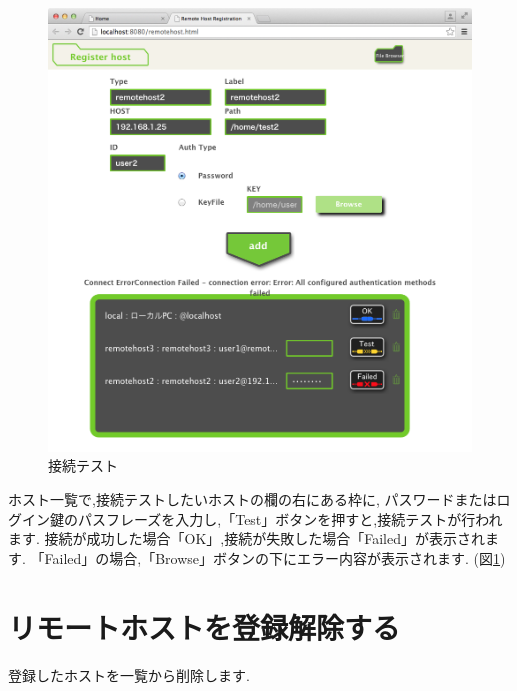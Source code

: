 \documentclass[a4paper,10pt,oneside]{jsbook}
\begin{document}
\begin{figure}[H]
	\begin{center}
		\includegraphics[width=12.0cm]{image/remotehost_001.png}
	\end{center}
	\caption{接続テスト}
	\label{fig:remotetest}
\end{figure}

ホスト一覧で,接続テストしたいホストの欄の右にある枠に,
パスワードまたはログイン鍵のパスフレーズを入力し,「Test」ボタンを押すと,接続テストが行われます.
接続が成功した場合「OK」,接続が失敗した場合「Failed」が表示されます.
「Failed」の場合,「Browse」ボタンの下にエラー内容が表示されます.
(図\ref{fig:remotetest})

\newpage
		
\section{リモートホストを登録解除する}
登録したホストを一覧から削除します.
\end{document}
